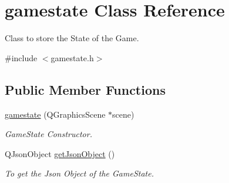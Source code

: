 \hypertarget{classgamestate}{}\section{gamestate Class Reference}
\label{classgamestate}


Class to store the State of the Game.  




{\ttfamily \#include $<$gamestate.\+h$>$}

\subsection*{Public Member Functions}
\begin{DoxyCompactItemize}
\item 
\mbox{\label{classgamestate_ab58660ea8cba18f34d30afdf9afeee3a}} 
\hyperlink{classgamestate_ab58660ea8cba18f34d30afdf9afeee3a}{gamestate} (Q\+Graphics\+Scene $\ast$scene)
\begin{DoxyCompactList}\small\item\em Game\+State Constructor. \end{DoxyCompactList}\item 
\mbox{\label{classgamestate_a2c5d0f47e823da319e366b4c3674520e}} 
Q\+Json\+Object \hyperlink{classgamestate_a2c5d0f47e823da319e366b4c3674520e}{get\+Json\+Object} ()
\begin{DoxyCompactList}\small\item\em To get the Json Object of the Game\+State. \end{DoxyCompactList}\end{DoxyCompactItemize}
